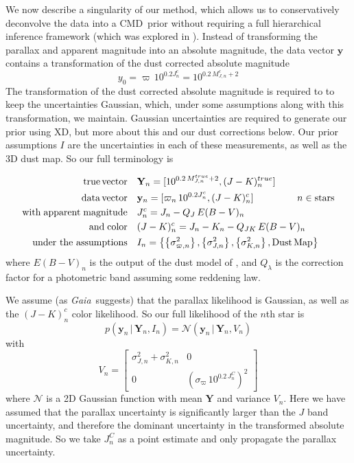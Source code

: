 \documentclass[modern]{aastex61}
\newcommand{\acronym}[1]{{\small{#1}}}
\newcommand{\project}[1]{\textsl{#1}}
\newcommand{\gaia}{\project{Gaia}}
\newcommand{\xd}{\acronym{XD}}
\newcommand{\cmd}{\acronym{CMD}}
\newcommand{\given}{\,|\,}
\begin{document}
We now describe a singularity of our method, which allows us to conservatively deconvolve the data into a \cmd\ prior without requiring a full hierarchical inference framework (which was explored in \citealt{leistedtHogg2017}).
Instead of transforming the parallax and apparent magnitude into an absolute magnitude, the data vector $\mathbf{y}$ contains a transformation of the dust corrected absolute magnitude
\begin{equation}
y_0 = \varpi\,10^{0.2J^c_n} = 10^{0.2\,M^c_{J,n} + 2}
\label{eq:transform}
\end{equation}
The transformation of the dust corrected absolute magnitude is required to to keep the uncertainties Gaussian, which, under some assumptions along with this transformation, we maintain. Gaussian uncertainties are required to generate our prior using \xd, but more about this and our dust corrections below.
Our prior assumptions $I$ are the uncertainties in each of these measurements, as well as the 3D dust map. So our full terminology is

\begin{equation}
\begin{aligned}
\mathrm{true \, vector} \quad &\mathbf{Y}_n = [10^{0.2\,M^{true}_{J,n} + 2}, (J-K)^{true}_n] \\
\mathrm{data \, vector} \quad &\mathbf{y}_n = [\varpi_n\,10^{0.2J^c_n}, (J- K)^c_n] \;\hspace*{15mm}  n \in \mathrm{stars} \\
\mathrm{with \; apparent \; magnitude} \quad &J^c_n = J_n - Q_J\,E(B-V)_n \\
\mathrm{and \; color} \quad &(J - K)^c_n = J_n - K_n - Q_{JK}\,E(B-V)_n \\
\mathrm{under\ the\ assumptions} \quad &I_n = \left\{\left\{\sigma^2_{\varpi, n}\right\}, \left\{\sigma^2_{J,n}\right\}, \left\{\sigma^2_{K,n}\right\}, \mathrm{Dust \, Map}\right\}
\end{aligned}
\label{eq:data}
\end{equation}
where $E(B-V)_n$ is the output of the dust model of \cite{green15}, and $Q_{\lambda}$ is the correction factor for a photometric band assuming some reddening law.

We assume (as \gaia\ suggests) that the parallax likelihood is Gaussian, as well as the $(J-K)^c_n$ color likelihood. So our full likelihood of the $n$th star is
\begin{equation}
p(\mathbf{y}_n \given \mathbf{Y}_n, I_n) = \mathcal{N}(\mathbf{y}_n \given \mathbf{Y}_n, V_n)
\end{equation}
with \\
\[
V_n = \begin{bmatrix}
\sigma_{J,n}^2 + \sigma_{K,n}^2 & 0 \\
0 & (\sigma_{\varpi}\,10^{0.2\,J_n^C})^2
\end{bmatrix}
\]
where $\mathcal{N}$ is a 2D Gaussian function with mean $\mathbf{Y}$ and variance $V_n$.
Here we have assumed that the parallax uncertainty is significantly larger than the $J$ band uncertainty, and therefore the dominant uncertainty in the transformed absolute magnitude. So we take $J_n^C$ as a point estimate and only propagate the parallax uncertainty.
\end{document}
